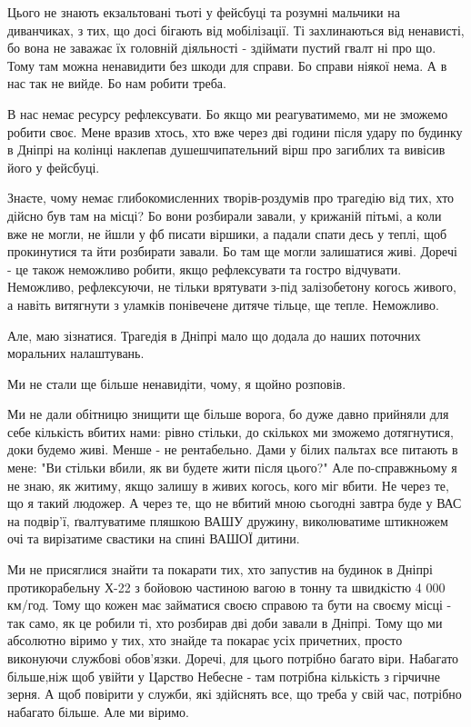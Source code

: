 Цього не знають екзальтовані тьоті у фейсбуці та розумні мальчики на
диванчиках, з тих, що досі бігають від мобілізації. Ті захлинаються від
ненависті, бо вона не заважає їх головній діяльності - здіймати пустий гвалт ні
про що. Тому там можна ненавидити без шкоди для справи. Бо справи ніякої нема.
А в нас так не вийде. Бо нам робити треба.

В нас немає ресурсу рефлексувати. Бо якщо ми реагуватимемо, ми не зможемо
робити своє.  Мене вразив хтось, хто вже через дві години після удару по
будинку в Дніпрі на колінці наклепав душешчипательний вірш про загиблих та
вивісив його у фейсбуці. 

Знаєте, чому немає глибокомисленних творів-роздумів про трагедію від тих, хто
дійсно був там на місці? Бо вони розбирали завали, у крижаній пітьмі, а коли
вже не могли, не йшли у фб писати віршики, а  падали спати десь у теплі, щоб
прокинутися та йти розбирати завали. Бо там ще могли залишатися живі. Доречі -
це також неможливо робити, якщо рефлексувати та гостро відчувати. Неможливо,
рефлексуючи, не тільки врятувати з-під залізобетону когось живого, а навіть
витягнути з уламків понівечене дитяче тільце, ще тепле. Неможливо.

Але, маю зізнатися. Трагедія в Дніпрі мало що додала до наших поточних
моральних налаштувань.

Ми не стали ще більше ненавидіти, чому, я щойно розповів.

Ми не дали обітницю знищити ще більше ворога, бо дуже давно прийняли для себе
кількість вбитих нами: рівно стільки, до скількох ми зможемо дотягнутися, доки
будемо живі. Менше - не рентабельно. Дами у білих пальтах все питають в мене:
"Ви стільки вбили, як ви будете жити після цього?" Але по-справжньому я не
знаю, як житиму, якщо залишу в живих когось, кого міг вбити. Не через те, що я
такий людожер. А через те, що не вбитий мною сьогодні завтра буде у ВАС на
подвір'ї, ґвалтуватиме пляшкою ВАШУ дружину, виколюватиме штикножем очі та
вирізатиме свастики на спині ВАШОЇ дитини.

Ми не присяглися знайти та покарати тих, хто запустив на будинок в Дніпрі
протикорабельну Х-22 з бойовою частиною вагою в тонну та швидкістю 4 000
км/год. Тому що кожен має займатися своєю справою та бути на своєму місці - так
само, як це робили ті, хто розбирав  дві доби завали в  Дніпрі. Тому що ми
абсолютно віримо у тих, хто знайде та покарає усіх причетних, просто виконуючи
службові обов'язки. Доречі, для цього потрібно багато віри. Набагато більше,ніж
щоб увійти у Царство Небесне - там потрібна кількість з гірчичне зерня. А щоб
повірити у служби, які здійснять все, що треба у свій час, потрібно набагато
більше. Але ми віримо.

